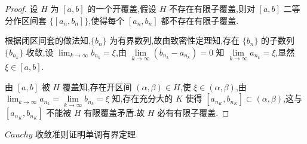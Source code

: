 \begin{proof}
	设 $H$ 为 $[a, b]$ 的一个开覆盖,假设 $H$ 不存在有限子覆盖,则对 $[a, b]$ 二等分作区间套 $\{[a_n, b_n]\}$,使得每个 $[a_n, b_n]$ 都不存在有限子覆盖.

根据闭区间套的做法知,$\{b_n\}$ 为有界数列,故由致密性定理知,存在 $\{b_n\}$ 的子数列 $\{b_{n_k}\}$ 收敛,设 $\lim_{k \to \infty} b_{n_k} = \xi$,由 $\lim\limits_{k \to \infty} (b_{n_k} - a_{n_k}) = 0$ 知 $\lim\limits_{k \to \infty} a_{n_k} = \xi$,显然 $\xi \in [a, b]$.

由 $[a, b]$ 被 $H$ 覆盖知,存在开区间 $(\alpha, \beta) \in H$,使 $\xi \in (\alpha, \beta)$,由 $\lim_{k \to \infty} a_{n_k} = \lim\limits_{k \to \infty} b_{n_k} = \xi$ 知,存在充分大的 $K$ 使得 $[a_{n_K}, b_{n_K}] \subset (\alpha, \beta)$,这与 $[a_{n_K}, b_{n_K}]$ 不能被 $H$ 有限覆盖矛盾.故 $H$ 必有有限子覆盖.
\end{proof}


\begin{proposition}
	 $Cauchy$ 收敛准则证明单调有界定理
\end{proposition}


